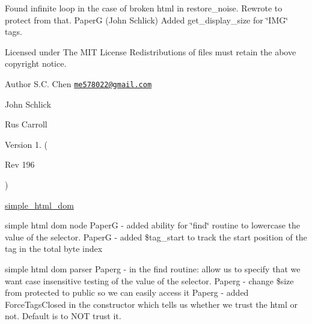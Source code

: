 Found infinite loop in the case of broken html in restore\+\_\+noise. Rewrote to protect from that. PaperG (John Schlick) Added get\+\_\+display\+\_\+size for \char`\"{}\+I\+M\+G\char`\"{} tags.

Licensed under The M\+IT License Redistributions of files must retain the above copyright notice.

\begin{DoxyAuthor}{Author}
S.\+C. Chen \href{mailto:me578022@gmail.com}{\tt me578022@gmail.\+com} 

John Schlick 

Rus Carroll 
\end{DoxyAuthor}
\begin{DoxyVersion}{Version}
1. (
\end{DoxyVersion}
\begin{DoxyParagraph}{Rev}
196 
\end{DoxyParagraph}
)

\hyperlink{classsimple__html__dom}{simple\+\_\+html\+\_\+dom}

simple html dom node PaperG -\/ added ability for \char`\"{}find\char`\"{} routine to lowercase the value of the selector. PaperG -\/ added \$tag\+\_\+start to track the start position of the tag in the total byte index

simple html dom parser Paperg -\/ in the find routine\+: allow us to specify that we want case insensitive testing of the value of the selector. Paperg -\/ change \$size from protected to public so we can easily access it Paperg -\/ added Force\+Tags\+Closed in the constructor which tells us whether we trust the html or not. Default is to N\+OT trust it. 